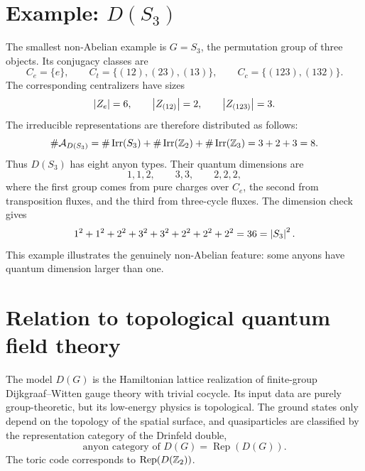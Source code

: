 \section{Example: \texorpdfstring{\(D(S_3)\)}{D(S3)}}
\label{sec:quantum-double-s3-example}

The smallest non-Abelian example is \(G=S_3\), the permutation group of three
objects.  Its conjugacy classes are
\begin{equation}
\label{eq:s3-conjugacy-classes}
    C_e=\{e\},
    \qquad
    C_t=\{(12),(23),(13)\},
    \qquad
    C_c=\{(123),(132)\} .
\end{equation}
The corresponding centralizers have sizes
\begin{equation}
\label{eq:s3-centralizer-sizes}
    \left|Z_e\right|=6,
    \qquad
    \left|Z_{(12)}\right|=2,
    \qquad
    \left|Z_{(123)}\right|=3 .
\end{equation}
The irreducible representations are therefore distributed as follows:
\begin{equation}
\label{eq:s3-anyon-count}
    \#\mathcal{A}_{D(S_3)}
    =
    \#\operatorname{Irr}(S_3)
    +\#\operatorname{Irr}(\mathbb{Z}_2)
    +\#\operatorname{Irr}(\mathbb{Z}_3)
    =3+2+3=8 .
\end{equation}
Thus \(D(S_3)\) has eight anyon types.  Their quantum dimensions are
\begin{equation}
\label{eq:s3-quantum-dimensions-list}
    1,1,2,
    \qquad
    3,3,
    \qquad
    2,2,2,
\end{equation}
where the first group comes from pure charges over \(C_e\), the second from
transposition fluxes, and the third from three-cycle fluxes.  The dimension
check gives
\begin{equation}
\label{eq:s3-total-quantum-dimension-check}
    1^2+1^2+2^2+3^2+3^2+2^2+2^2+2^2=36=\left|S_3\right|^2 .
\end{equation}
This example illustrates the genuinely non-Abelian feature: some anyons have
quantum dimension larger than one.

\section{Relation to topological quantum field theory}
\label{sec:quantum-double-tqft-viewpoint}

The model \(D(G)\) is the Hamiltonian lattice realization of finite-group
Dijkgraaf--Witten gauge theory with trivial cocycle.  Its input data are purely
group-theoretic, but its low-energy physics is topological.  The ground states
only depend on the topology of the spatial surface, and quasiparticles are
classified by the representation category of the Drinfeld double,
\begin{equation}
\label{eq:quantum-double-category}
    \text{anyon category of }D(G)
    =
    \operatorname{Rep}(D(G)) .
\end{equation}
The toric code corresponds to \(\operatorname{Rep}(D(\mathbb{Z}_2))\).

